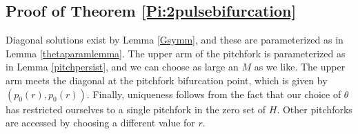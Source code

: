 \documentclass[thesis.tex]{subfiles}
\begin{document}
\subsection{Proof of Theorem \ref{Pi:2pulsebifurcation}}

Diagonal solutions exist by Lemma \ref{Gsymm}, and these are parameterized as in Lemma \ref{thetaparamlemma}. The upper arm of the pitchfork is parameterized as in Lemma \ref{pitchpersist}, and we can choose as large an $M$ as we like. The upper arm meets the diagonal at the pitchfork bifurcation point, which is given by $(p_0(r), p_0(r))$. Finally, uniqueness follows from the fact that our choice of $\theta$ has restricted ourselves to a single pitchfork in the zero set of $H$. Other pitchforks are accessed by choosing a different value for $r$.

% 
% 
\end{document}
